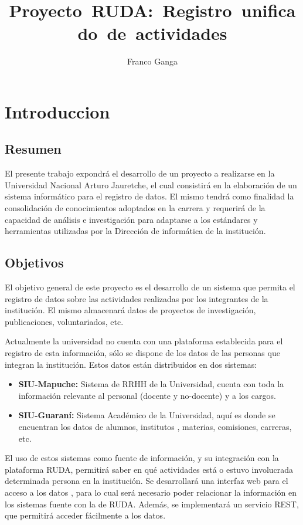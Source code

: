 \documentclass{article}
\author{Franco Ganga}
\title{Proyecto\ RUDA:\ Registro\ unificado\ de\ actividades}
\begin{document}
\maketitle

\section{Introduccion}%
\label{sec:introduccion}

\subsection{Resumen}%
\label{sub:resumen}

El presente trabajo expondrá el desarrollo de un proyecto a realizarse en la Universidad Nacional Arturo Jauretche, el cual
consistirá en la elaboración de un sistema informático para el registro de datos\@. El mismo tendrá como finalidad la consolidación
de conocimientos adoptados en la carrera y requerirá de la capacidad de análisis e investigación para adaptarse a los estándares
y herramientas utilizadas por la Dirección de informática de la institución.

\subsection{Objetivos}%
\label{sub:objetivos}


El objetivo general de este proyecto es el desarrollo de un sistema que permita el registro de datos sobre las actividades
realizadas por los integrantes de la institución. El mismo almacenará datos de proyectos de investigación, publicaciones, voluntariados, etc.

Actualmente la universidad no cuenta con una plataforma establecida para el registro de esta información, sólo se dispone de
los datos de las personas que integran la institución. Estos datos están distribuidos en dos sistemas:
\begin{itemize}
    \item \textbf{SIU-Mapuche:} Sistema de RRHH de la Universidad, cuenta con toda la información relevante al personal (docente
        y no-docente) y a los cargos.
    \item \textbf{SIU-Guaraní:} Sistema Académico de la Universidad, aquí es donde se encuentran los datos de alumnos, institutos
        , materias, comisiones, carreras, etc.
\end{itemize}

El uso de estos sistemas como fuente de información, y su integración con la plataforma RUDA, permitirá saber en qué actividades
está o estuvo involucrada determinada persona en la institución. Se desarrollará una interfaz web para el acceso a los datos
, para lo cual será necesario poder relacionar la información en los sistemas fuente con la de RUDA\@. Además, se implementará
un servicio REST, que permitirá acceder fácilmente a los datos.
\end{document}
